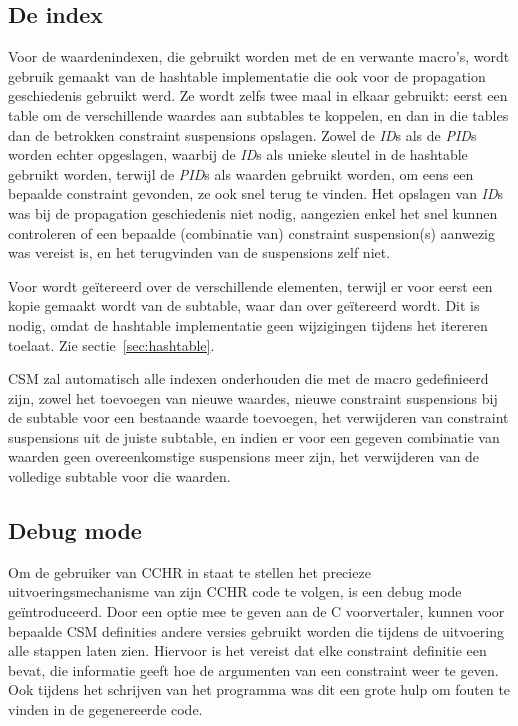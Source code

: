 \subsection{De index} \label{sec:index}

Voor de waardenindexen, die gebruikt worden met de  en verwante macro's, wordt gebruik gemaakt van de hashtable implementatie die ook voor de propagation geschiedenis gebruikt werd. Ze wordt zelfs twee maal in elkaar gebruikt: eerst een table om de verschillende waardes aan subtables te koppelen, en dan in die tables dan de betrokken constraint suspensions opslagen. Zowel de {\em ID}s als de {\em PID}s worden echter opgeslagen, waarbij de {\em ID}s als unieke sleutel in de hashtable gebruikt worden, terwijl de {\em PID}s als waarden gebruikt worden, om eens een bepaalde constraint gevonden, ze ook snel terug te vinden. Het opslagen van {\em ID}s was bij de propagation geschiedenis niet nodig, aangezien enkel het snel kunnen controleren of een bepaalde (combinatie van) constraint suspension(s) aanwezig was vereist is, en het terugvinden van de suspensions zelf niet.

Voor  wordt ge\"itereerd over de verschillende elementen, terwijl er voor  eerst een kopie gemaakt wordt van de subtable, waar dan over ge\"itereerd wordt. Dit is nodig, omdat de hashtable implementatie geen wijzigingen tijdens het itereren toelaat. Zie sectie~\ref{sec:hashtable}.

CSM zal automatisch alle indexen onderhouden die met de macro  gedefinieerd zijn, zowel het toevoegen van nieuwe waardes, nieuwe constraint suspensions bij de subtable voor een bestaande waarde toevoegen, het verwijderen van constraint suspensions uit de juiste subtable, en indien er voor een gegeven combinatie van waarden geen overeenkomstige suspensions meer zijn, het verwijderen van de volledige subtable voor die waarden.

\subsection{Debug mode} \label{sec:debug}

Om de gebruiker van CCHR in staat te stellen het precieze uitvoeringsmechanisme van zijn CCHR code te volgen, is een debug mode ge\"introduceerd. Door een optie mee te geven aan de C voorvertaler, kunnen voor bepaalde CSM definities andere versies gebruikt worden die tijdens de uitvoering alle stappen laten zien. Hiervoor is het vereist dat elke constraint definitie een  bevat, die informatie geeft hoe de argumenten van een constraint weer te geven. Ook tijdens het schrijven van het programma was dit een grote hulp om fouten te vinden in de gegenereerde code.

